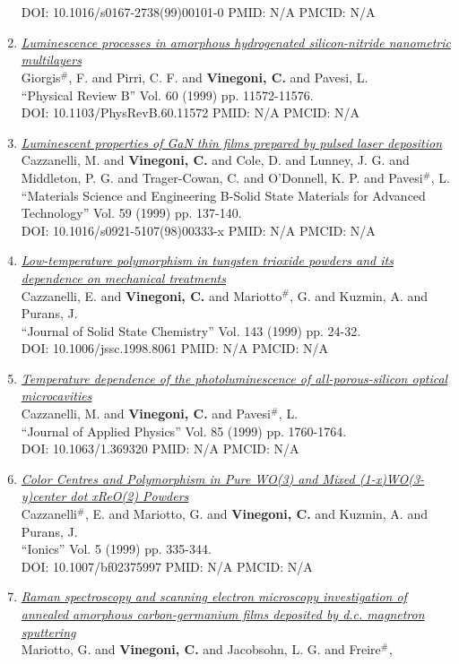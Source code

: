 \documentclass{resume}
\begin{document}
\begin{category}{~~}
\begin{enumerate}
\\ DOI: 10.1016/s0167-2738(99)00101-0 PMID: N/A PMCID: N/A\item \href{https://cvinegoni.github.io/assets/pdf/papers/1999-PRB.pdf}{\it  Luminescence processes in amorphous hydrogenated silicon-nitride nanometric multilayers} \\ Giorgis$^\#$, F. and Pirri, C. F. and {\bf Vinegoni, C.} and Pavesi, L. \\ ``Physical Review B'' Vol. 60 (1999) pp. 11572-11576. \\ DOI: 10.1103/PhysRevB.60.11572 PMID: N/A PMCID: N/A\item \href{https://cvinegoni.github.io/assets/pdf/papers/1999-MSEB.pdf}{\it  Luminescent properties of GaN thin films prepared by pulsed laser deposition} \\ Cazzanelli, M. and {\bf Vinegoni, C.} and Cole, D. and Lunney, J. G. and Middleton, P. G. and Trager-Cowan, C. and O'Donnell, K. P. and Pavesi$^\#$, L. \\ ``Materials Science and Engineering B-Solid State Materials for Advanced Technology'' Vol. 59 (1999) pp. 137-140. \\ DOI: 10.1016/s0921-5107(98)00333-x PMID: N/A PMCID: N/A\item \href{https://cvinegoni.github.io/assets/pdf/papers/1999-JSSC.pdf}{\it  Low-temperature polymorphism in tungsten trioxide powders and its dependence on mechanical treatments} \\ Cazzanelli, E. and {\bf Vinegoni, C.} and Mariotto$^\#$, G. and Kuzmin, A. and Purans, J. \\ ``Journal of Solid State Chemistry'' Vol. 143 (1999) pp. 24-32. \\ DOI: 10.1006/jssc.1998.8061 PMID: N/A PMCID: N/A\item \href{https://cvinegoni.github.io/assets/pdf/papers/1999-JAP.pdf}{\it  Temperature dependence of the photoluminescence of all-porous-silicon optical microcavities} \\ Cazzanelli, M. and {\bf Vinegoni, C.} and Pavesi$^\#$, L. \\ ``Journal of Applied Physics'' Vol. 85 (1999) pp. 1760-1764. \\ DOI: 10.1063/1.369320 PMID: N/A PMCID: N/A\item \href{https://cvinegoni.github.io/assets/pdf/papers/1999-INCS.pdf}{\it  Color Centres and Polymorphism in Pure WO(3) and Mixed (1-x)WO(3-y)center dot xReO(2) Powders} \\ Cazzanelli$^\#$, E. and Mariotto, G. and {\bf Vinegoni, C.} and Kuzmin, A. and Purans, J. \\ ``Ionics'' Vol. 5 (1999) pp. 335-344. \\ DOI: 10.1007/bf02375997 PMID: N/A PMCID: N/A\item \href{https://cvinegoni.github.io/assets/pdf/papers/1999-DRM.pdf}{\it  Raman spectroscopy and scanning electron microscopy investigation of annealed amorphous carbon-germanium films deposited by d.c. magnetron sputtering} \\ Mariotto, G. and {\bf Vinegoni, C.} and Jacobsohn, L. G. and Freire$^\#$, 
\end{enumerate}
\end{category}
\end{document}
